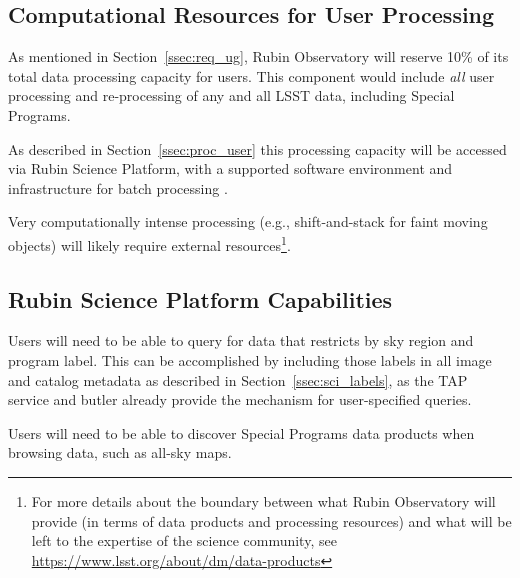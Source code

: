 \subsection{Computational Resources for User Processing}

As mentioned in Section~\ref{ssec:req_ug}, Rubin Observatory will reserve 10\% of its 
total data processing capacity for users.
This component would include {\it all} user processing and re-processing of any and 
all LSST data, including Special Programs. 

As described in Section~\ref{ssec:proc_user} this processing capacity will be 
accessed via Rubin Science Platform, with a supported software environment and 
infrastructure for batch processing .

Very computationally intense processing (e.g., shift-and-stack for faint moving 
objects) will likely require external resources\footnote{For more details about the boundary between what Rubin Observatory will provide (in terms of data products and processing resources) and what will be left to the expertise of the science community, see \url{https://www.lsst.org/about/dm/data-products}}.


\subsection{Rubin Science Platform Capabilities}

Users will need to be able to query for data that restricts by sky region and 
program label. 
This can be accomplished by including those labels in all image and catalog 
metadata as described in Section~\ref{ssec:sci_labels}, as the TAP service 
and butler already provide the mechanism for user-specified queries.

Users will need to be able to discover Special Programs data products when 
browsing data, such as all-sky maps. 


